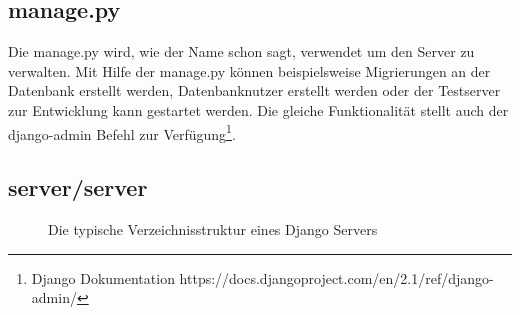 \documentclass{article}
\begin{document}
\subsection{manage.py}
Die manage.py wird, wie der Name schon sagt, verwendet um den Server zu verwalten. Mit Hilfe der manage.py können beispielsweise Migrierungen an der Datenbank erstellt werden, Datenbanknutzer erstellt werden oder der Testserver zur Entwicklung kann gestartet werden. Die gleiche Funktionalität stellt auch der django-admin Befehl zur Verfügung\footnote{Django Dokumentation https://docs.djangoproject.com/en/2.1/ref/django-admin/}.
\subsection{server/server} 

\begin{figure}[H]
	\caption{Die typische Verzeichnisstruktur eines Django Servers}
\end{figure}
\end{document}
